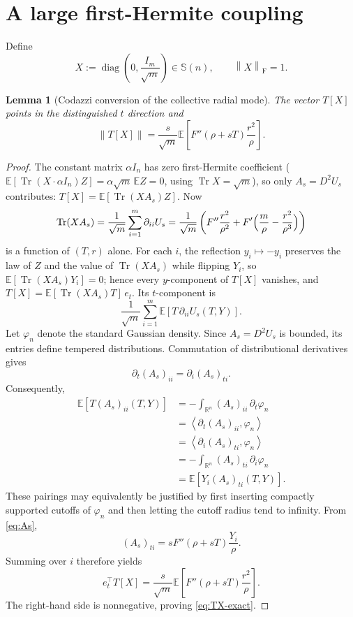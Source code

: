 \documentclass[11pt]{article}
\theoremstyle{plain}
\newtheorem{lemma}[theorem]{Lemma}
\theoremstyle{definition}
\theoremstyle{remark}
\newcommand{\R}{\mathbb{R}}
\newcommand{\E}{\mathbb{E}}
\newcommand{\Sym}{\mathbb{S}}
\newcommand{\Tr}{\operatorname{Tr}}
\newcommand{\diag}{\operatorname{diag}}
\newcommand{\Id}{I}
\newcommand{\1}{\mathbf{1}}
\newcommand{\norm}[1]{\left\lVert #1\right\rVert}
\begin{document}
\section{A large first-Hermite coupling}

Define
\begin{equation}
    X
    :=
    \diag\left(0,\frac{\Id_m}{\sqrt m}\right)
    \in\Sym(n),
    \qquad
    \norm X_{\mathrm F}=1.
    \label{eq:X-def}
\end{equation}

\begin{lemma}[Codazzi conversion of the collective radial mode]
\label{lem:codazzi}
The vector $T[X]$ points in the distinguished $t$ direction and
\begin{equation}
    \norm{T[X]}
    =
    \frac{s}{\sqrt m}
    \E\!\left[
        F''(\rho+sT)\frac{r^2}{\rho}
    \right].
    \label{eq:TX-exact}
\end{equation}
\end{lemma}

\begin{proof}
The constant matrix $\alpha\Id_n$ has zero first-Hermite coefficient
($\E[\Tr(X\cdot\alpha\Id_n)Z]=\alpha\sqrt m\,\E Z=0$, using
$\Tr X=\sqrt m$), so only $A_s=D^2U_s$ contributes:
$T[X]=\E[\Tr(XA_s)Z]$. Now
\[
    \Tr(XA_s)
    =\frac1{\sqrt m}\sum_{i=1}^m\partial_{ii}U_s
    =\frac1{\sqrt m}\left(
        F''\frac{r^2}{\rho^2}+F'\Bigl(\frac m\rho-\frac{r^2}{\rho^3}\Bigr)
    \right)
\]
is a function of $(T,r)$ alone. For each $i$, the reflection
$y_i\mapsto-y_i$ preserves the law of $Z$ and the value of $\Tr(XA_s)$ while
flipping $Y_i$, so $\E[\Tr(XA_s)Y_i]=0$; hence every $y$-component of $T[X]$
vanishes, and $T[X]=\E[\Tr(XA_s)T]\,e_t$. Its $t$-component is
\[
    \frac1{\sqrt m}
    \sum_{i=1}^m
    \E\!\left[
        T\,\partial_{ii}U_s(T,Y)
    \right].
\]
Let $\varphi_n$ denote the standard Gaussian density. Since $A_s=D^2U_s$
is bounded, its entries define tempered distributions. Commutation of
distributional derivatives gives
\[
    \partial_t(A_s)_{ii}=\partial_i(A_s)_{ti}.
\]
Consequently,
\begin{align*}
    \E[T(A_s)_{ii}(T,Y)]
    &=
    -\int_{\R^n}(A_s)_{ii}\,\partial_t\varphi_n\\
    &=
    \left\langle\partial_t(A_s)_{ii},\varphi_n\right\rangle\\
    &=
    \left\langle\partial_i(A_s)_{ti},\varphi_n\right\rangle\\
    &=
    -\int_{\R^n}(A_s)_{ti}\,\partial_i\varphi_n\\
    &=
    \E[Y_i(A_s)_{ti}(T,Y)].
\end{align*}
These pairings may equivalently be justified by first inserting compactly
supported cutoffs of $\varphi_n$ and then letting the cutoff radius tend to
infinity. From \eqref{eq:As},
\[
    (A_s)_{ti}
    =
    sF''(\rho+sT)\frac{Y_i}{\rho}.
\]
Summing over $i$ therefore yields
\[
    e_t^\top T[X]
    =
    \frac{s}{\sqrt m}
    \E\!\left[F''(\rho+sT)\frac{r^2}{\rho}\right].
\]
The right-hand side is nonnegative, proving \eqref{eq:TX-exact}.
\end{proof}
\end{document}
